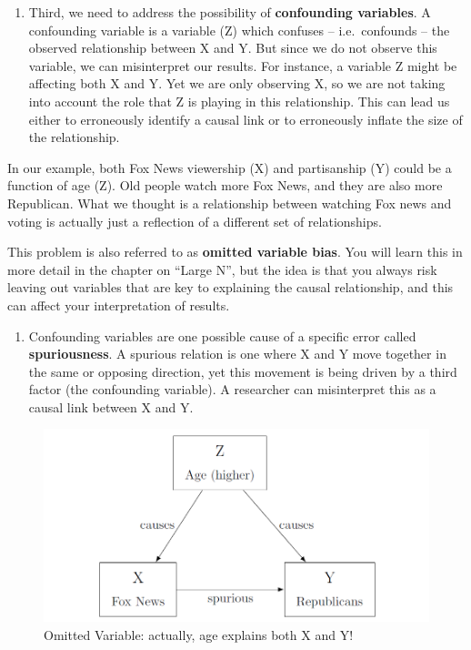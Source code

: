 \documentclass{book}
\providecommand{\tightlist}{%
  \setlength{\itemsep}{0pt}\setlength{\parskip}{0pt}}
\begin{document}
\begin{enumerate}
\def\labelenumi{\arabic{enumi}.}
\setcounter{enumi}{2}
\tightlist
\item
  Third, we need to address the possibility of \textbf{confounding variables}.
  A confounding variable is a variable (Z) which confuses -- i.e.~confounds --
  the observed relationship between X and Y. But since we do not observe this
  variable, we can misinterpret our results. For instance, a variable Z might
  be affecting both X and Y. Yet we are only observing X, so we are not taking
  into account the role that Z is playing in this relationship. This can lead
  us either to erroneously identify a causal link or to erroneously inflate
  the size of the relationship.
\end{enumerate}

In our example, both Fox News viewership (X) and partisanship (Y) could be a
function of age (Z). Old people watch more Fox News, and they are also more
Republican. What we thought is a relationship between watching Fox news and
voting is actually just a reflection of a different set of relationships.

This problem is also referred to as \textbf{omitted variable bias}. You will
learn this in more detail in the chapter on ``Large N'', but the idea is that
you always risk leaving out variables that are key to explaining the causal
relationship, and this can affect your interpretation of results.

\begin{enumerate}
\def\labelenumi{\arabic{enumi}.}
\setcounter{enumi}{3}
\tightlist
\item
  Confounding variables are one possible cause of a specific error called
  \textbf{spuriousness}. A spurious relation is one where X and Y move
  together in the same or opposing direction, yet this movement is being
  driven by a third factor (the confounding variable). A researcher can
  misinterpret this as a causal link between X and Y.
\end{enumerate}

\begin{figure}
\hypertarget{fig:fig2-3}{%
\centering
\includegraphics{images/CI/fig2-3.png}
\caption{Omitted Variable: actually, age explains both X and
Y!}\label{fig:fig2-3}
}
\end{figure}
\end{document}
